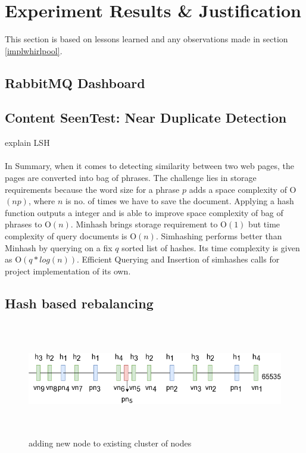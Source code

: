 \chapter{Experiment Results \& Justification}
This section is based on lessons learned and any observations made in section \ref{implwhirlpool}.

\section{RabbitMQ Dashboard}

\pagebreak



\section{Content SeenTest: Near Duplicate Detection}\label{handle_dedupe}
explain LSH
\\
\\
In Summary, when it comes to detecting similarity between two web pages, the pages are converted into
bag of phrases. The challenge lies in storage requirements because the word size for a phrase $p$ adds
a space complexity of O$(np)$, where $n$ is no. of times we have to save the document. Applying a hash
function outputs a integer and is able to improve space complexity of bag of phrases to O$(n)$.
Minhash\cite{dedupe} brings storage requirement to O$(1)$ but time complexity of query documents is
O$(n)$. Simhashing\cite{dedupe} performs better than Minhash by querying on a fix $q$ sorted list of
hashes. Its time complexity is given as O$(q * log(n))$. Efficient Querying and Insertion of simhashes
calls for project implementation of its own.

\pagebreak

\section{Hash based rebalancing}
\begin{figure}[h!]
  \centering
  \includegraphics[width=12cm,height=5cm,keepaspectratio]{../media/crawler/addingnode.png}
  \caption{adding new node to existing cluster of nodes}
  \label{fig:addingnode}
\end{figure}

